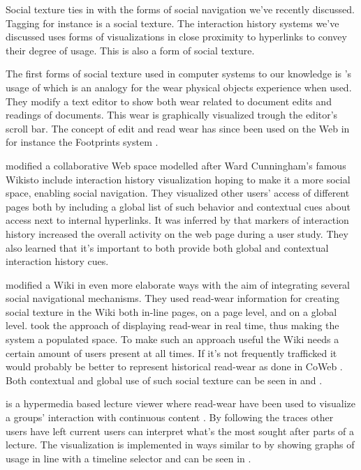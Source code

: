 Social texture ties in with the forms of social navigation we've
recently discussed. Tagging for instance is a social texture.
The interaction history systems we've discussed uses forms of visualizations
in close proximity to hyperlinks to convey their degree of usage. This is also
a form of social texture.

The first forms of social texture used in computer systems to our knowledge is
\citet{hill92}'s usage of  which is an analogy for
the wear physical objects experience when used. They modify a text editor to
show both wear related to document edits and readings of documents. This wear
is graphically visualized trough the editor's scroll bar.
The concept of edit and read wear has since been used on the Web in for
instance the Footprints system \citep{wexelblat99}.

\citet{dieberger00a} modified \dash{}a collaborative Web space
modelled after Ward Cunningham's famous Wikis\dash{}to include interaction
history visualization hoping to make it a more social space, enabling social
navigation. They visualized other users' access of different pages both by
including a global list of such behavior and contextual cues about access
next to internal hyperlinks.
It was inferred by \citeauthor{dieberger00a} that markers of interaction
history increased the overall activity on the web page during a user study.
They also learned that it's important to both provide both global and
contextual interaction history cues.

\citet{xu06} modified a Wiki in even more elaborate ways
with the aim of integrating several social navigational mechanisms.
They used read-wear information for creating social
texture in the Wiki both in-line pages, on a page level, and on a global
level. \citeauthor{xu06} took the approach of displaying read-wear in real
time, thus making the system a populated space. To make such an approach
useful the Wiki needs a certain amount of users present at all times. If
it's not frequently trafficked it would probably be better to represent
historical read-wear as done in CoWeb \citep[]{dieberger00a}. Both
contextual and global use of such social texture can be seen in
 and .

 is a hypermedia based lecture viewer where read-wear
have been used to visualize a groups' interaction with continuous content
\citep{mertens06}. By following the traces other users have left current users
can interpret what's the most sought after parts of a lecture. The
visualization is implemented in ways similar to \citet{hill92} by showing
graphs of usage in line with a timeline selector and can be seen in
.

